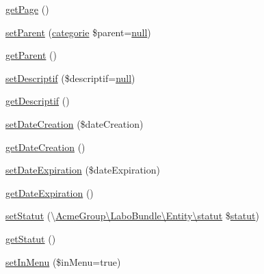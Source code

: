\begin{DoxyCompactItemize}
\item 
\hyperlink{class_acme_group_1_1_labo_bundle_1_1_entity_1_1categorie_a855bf857e446a08bb698610a71b66b8a}{get\+Page} ()
\item 
\hyperlink{class_acme_group_1_1_labo_bundle_1_1_entity_1_1categorie_ae809feefe7d1347182b5d18a5c3c870b}{set\+Parent} (\hyperlink{class_acme_group_1_1_labo_bundle_1_1_entity_1_1categorie}{categorie} \$parent=\hyperlink{validate_8js_afb8e110345c45e74478894341ab6b28e}{null})
\item 
\hyperlink{class_acme_group_1_1_labo_bundle_1_1_entity_1_1categorie_a9a94a10128c76ddeda86d372fadcb5f8}{get\+Parent} ()
\item 
\hyperlink{class_acme_group_1_1_labo_bundle_1_1_entity_1_1categorie_a928dd35b14f0946ea2452aaaa6647592}{set\+Descriptif} (\$descriptif=\hyperlink{validate_8js_afb8e110345c45e74478894341ab6b28e}{null})
\item 
\hyperlink{class_acme_group_1_1_labo_bundle_1_1_entity_1_1categorie_ac856baed9d9a8392012febce1e56e8dd}{get\+Descriptif} ()
\item 
\hyperlink{class_acme_group_1_1_labo_bundle_1_1_entity_1_1categorie_a6963e28b205b63e4bea9a8f8d374fbd1}{set\+Date\+Creation} (\$date\+Creation)
\item 
\hyperlink{class_acme_group_1_1_labo_bundle_1_1_entity_1_1categorie_a10993b823fe0800629bd618b4cdbbad6}{get\+Date\+Creation} ()
\item 
\hyperlink{class_acme_group_1_1_labo_bundle_1_1_entity_1_1categorie_a73969775136b9c88c8bf979c387830aa}{set\+Date\+Expiration} (\$date\+Expiration)
\item 
\hyperlink{class_acme_group_1_1_labo_bundle_1_1_entity_1_1categorie_a8a05100d792bbbeef27d3b22d923c0b9}{get\+Date\+Expiration} ()
\item 
\hyperlink{class_acme_group_1_1_labo_bundle_1_1_entity_1_1categorie_ad51c8ceaee09fdc1f4e10d54e3cc705f}{set\+Statut} (\textbackslash{}\hyperlink{class_acme_group_1_1_labo_bundle_1_1_entity_1_1statut}{Acme\+Group\textbackslash{}\+Labo\+Bundle\textbackslash{}\+Entity\textbackslash{}statut} \$\hyperlink{class_acme_group_1_1_labo_bundle_1_1_entity_1_1statut}{statut})
\item 
\hyperlink{class_acme_group_1_1_labo_bundle_1_1_entity_1_1categorie_af464638e9f9850242581b4c5ad24c65a}{get\+Statut} ()
\item 
\hyperlink{class_acme_group_1_1_labo_bundle_1_1_entity_1_1categorie_a70f94822ca10474e56cd720040060b67}{set\+In\+Menu} (\$in\+Menu=true)
\item 

\end{DoxyCompactItemize}
